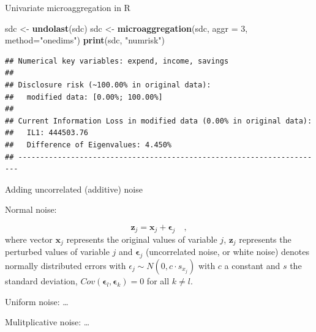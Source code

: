 \documentclass[ignorenonframetext,]{beamer}
\newenvironment{Shaded}{\begin{snugshade}}{\end{snugshade}}
\newcommand{\DataTypeTok}[1]{\textcolor[rgb]{0.13,0.29,0.53}{#1}}
\newcommand{\DecValTok}[1]{\textcolor[rgb]{0.00,0.00,0.81}{#1}}
\newcommand{\KeywordTok}[1]{\textcolor[rgb]{0.13,0.29,0.53}{\textbf{#1}}}
\newcommand{\NormalTok}[1]{#1}
\newcommand{\StringTok}[1]{\textcolor[rgb]{0.31,0.60,0.02}{#1}}
\begin{document}
\begin{frame}[fragile]{Univariate microaggregation in R}
\protect\hypertarget{univariate-microaggregation-in-r}{}

\begin{Shaded}
\begin{Highlighting}[]
\NormalTok{sdc <-}\StringTok{ }\KeywordTok{undolast}\NormalTok{(sdc)}
\NormalTok{sdc <-}\StringTok{ }\KeywordTok{microaggregation}\NormalTok{(sdc, }\DataTypeTok{aggr =} \DecValTok{3}\NormalTok{, }\DataTypeTok{method=}\StringTok{"onedims"}\NormalTok{)}
\KeywordTok{print}\NormalTok{(sdc, }\StringTok{"numrisk"}\NormalTok{)}
\end{Highlighting}
\end{Shaded}

\begin{verbatim}
## Numerical key variables: expend, income, savings
## 
## Disclosure risk (~100.00% in original data):
##   modified data: [0.00%; 100.00%]
## 
## Current Information Loss in modified data (0.00% in original data):
##   IL1: 444503.76
##   Difference of Eigenvalues: 4.450%
## ----------------------------------------------------------------------
\end{verbatim}

\end{frame}

\begin{frame}{Adding uncorrelated (additive) noise}
\protect\hypertarget{adding-uncorrelated-additive-noise}{}

Normal noise:

\begin{equation}
\mathbf{z}_j = \mathbf{x}_j + \mathbf{\epsilon}_j \quad ,
\end{equation} where vector \(\mathbf{x}_j\) represents the original
values of variable \(j\), \(\mathbf{z}_j\) represents the perturbed
values of variable \(j\) and \(\mathbf{\epsilon}_j\) (uncorrelated
noise, or white noise) denotes normally distributed errors with
\(\epsilon_j \sim N(0, c \cdot s_{x_j})\) with \(c\) a constant and
\(s\) the standard deviation,
\(Cov(\mathbf{\epsilon}_l,\mathbf{\epsilon}_k) = 0\) for all
\(k \neq l\).

Uniform noise: \ldots{}

Mulitplicative noise: \ldots{}

\end{frame}
\end{document}
